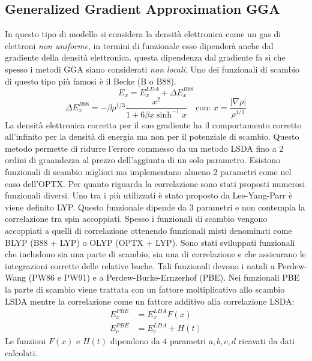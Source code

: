 \documentclass[oneside]{amsbook}
\numberwithin{section}{chapter}
\numberwithin{equation}{section}
\numberwithin{figure}{section}
\begin{document}
\subsection{Generalized Gradient Approximation GGA }
In questo tipo di modello si considera la densità elettronica come un gas di elettroni \emph{non uniforme}, in termini di funzionale esso dipenderà anche dal gradiente della densità elettronica. questa dipendenza dal gradiente fa sì che spesso i metodi GGA siano considerati \emph{non locali}.
Uno dei funzionali di scambio di questo tipo più famosi è il Becke (B o B88). 
\begin{equation}
E_x= E_x^{LDA}+\Delta E_x^{B88}
\end{equation}
\begin{equation}
\Delta E_x^{B88}=-\beta \rho^{1/3} \frac{x^2}{1+6\beta x \sinh^{-1}x} \quad \text{con: } x= \frac{\vert \nabla \rho \vert}{\rho^{4/3}}
\end{equation}
La densità elettronica corretta per il suo gradiente ha il comportamento corretto all'infinito per la densità di energia ma non per il potenziale di scambio. Questo metodo permette di ridurre l'errore commesso da un metodo LSDA fino a $2$ ordini di graandezza al prezzo dell'aggiunta di un solo parametro. Esistono funzionali di scambio migliori ma implementano almeno $2$ parametri come nel caso dell'OPTX.
Per quanto riguarda la correlazione sono stati proposti numerosi funzionali diversi. Uno tra i più utilizzati è stato proposto da Lee-Yang-Parr è viene definito LYP. Questo funzionale dipende da $3$ parametri e non contempla la correlazione tra spin accoppiati.
Spesso i funzionali di scambio vengono accoppiati a quelli di correlazione ottenendo funzionali misti denominati come BLYP (B88 + LYP) o OLYP (OPTX + LYP).
Sono stati sviluppati funzionali che includono sia una parte di scambio, sia una di correlazione e che assicurano le integrazioni corrette delle relative buche. Tali funzionali devono i natali a Perdew-Wang (PW86 e PW91) e a Perdew-Burke-Ernzerhof (PBE).  Nei funzionali PBE la parte di scambio viene trattata con un fattore moltiplicativo allo scambio LSDA mentre la correlazione come un fattore additivo alla correlazione LSDA:
\begin{equation}
\begin{aligned}
E_x^{PBE} &= E_x^{LDA} F(x) \\
E_c^{PBE} &= E_c^{LDA} + H(t)
\end{aligned}
\end{equation}
Le funzioni $F(x)$ e $H(t)$ dipendono da $4$ parametri $a,b,c,d$ ricavati da dati calcolati.
\end{document}
